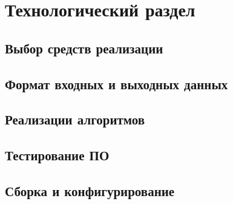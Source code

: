 \chapter{Технологический раздел}

\section{Выбор средств реализации}

\section{Формат входных и выходных данных}

\section{Реализации алгоритмов}

\section{Тестирование ПО}

\section{Сборка и конфигурирование}
